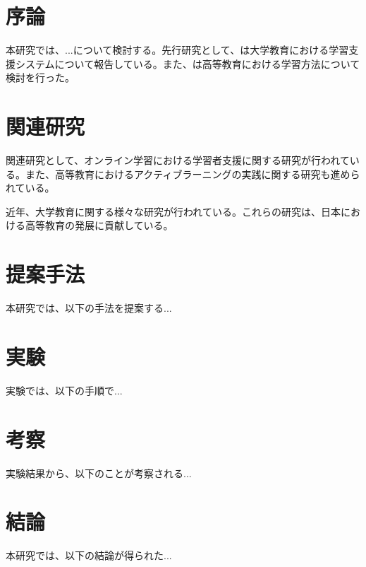 \section{序論}
本研究では、...について検討する。先行研究として、は大学教育における学習支援システムについて報告している。また、は高等教育における学習方法について検討を行った。

\section{関連研究}
関連研究として、オンライン学習における学習者支援に関する研究が行われている。また、高等教育におけるアクティブラーニングの実践に関する研究も進められている。

近年、大学教育に関する様々な研究が行われている。これらの研究は、日本における高等教育の発展に貢献している。

\section{提案手法}
本研究では、以下の手法を提案する...

\section{実験}
実験では、以下の手順で...

\section{考察}
実験結果から、以下のことが考察される...

\section{結論}
本研究では、以下の結論が得られた... 